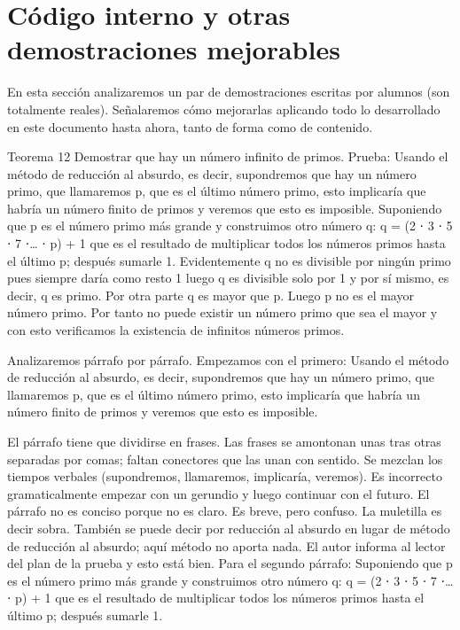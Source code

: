 \section{Código interno y otras demostraciones mejorables}


En esta sección analizaremos un par de demostraciones escritas por alumnos (son totalmente reales). Señalaremos cómo mejorarlas aplicando todo lo desarrollado en este documento hasta ahora, tanto de forma como de contenido.

Teorema 12 Demostrar que hay un número infinito de primos.
Prueba: Usando el método de reducción al absurdo, es decir, supondremos que hay un número primo, que llamaremos p, que es el último número primo, esto implicaría que habría un número finito de primos y veremos que esto es imposible.
Suponiendo que p es el número primo más grande y construimos otro número q: q = (2 ⋅ 3 ⋅ 5 ⋅ 7 ⋅… ⋅ p) + 1 que es el resultado de multiplicar todos los números primos hasta el último p; después sumarle 1.
Evidentemente q no es divisible por ningún primo pues siempre daría como resto 1 luego q es divisible solo por 1 y por sí mismo, es decir, q es primo. Por otra parte q es mayor que p. Luego p no es el mayor número primo. Por tanto no puede existir un número primo que sea el mayor y con esto verificamos la existencia de infinitos números primos.

Analizaremos párrafo por párrafo. Empezamos con el primero:
Usando el método de reducción al absurdo, es decir, supondremos que hay un número primo, que llamaremos p, que es el último número primo, esto implicaría que habría un número finito de primos y veremos que esto es imposible.

El párrafo tiene que dividirse en frases. Las frases se amontonan unas tras otras separadas por comas; faltan conectores que las unan con sentido.
Se mezclan los tiempos verbales (supondremos, llamaremos, implicaría, veremos).
Es incorrecto gramaticalmente empezar con un gerundio y luego continuar con el futuro.
El párrafo no es conciso porque no es claro. Es breve, pero confuso.
La muletilla es decir sobra. También se puede decir por reducción al absurdo en lugar de método de reducción al absurdo; aquí método no aporta nada.
El autor informa al lector del plan de la prueba y esto está bien.
Para el segundo párrafo:
Suponiendo que p es el número primo más grande y construimos otro número q: q = (2 ⋅ 3 ⋅ 5 ⋅ 7 ⋅… ⋅ p) + 1 que es el resultado de multiplicar todos los números primos hasta el último p; después sumarle 1.

